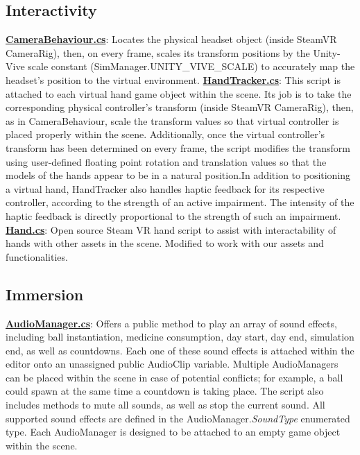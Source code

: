 \documentclass{article}
\begin{document}
\subsection*{Interactivity} 
\href{https://bit.ly/2JH9ws0}{\textbf{CameraBehaviour.cs}}: Locates the physical headset object (inside SteamVR CameraRig), then, on every frame, scales its transform positions by the Unity-Vive scale constant (SimManager.UNITY\_VIVE\_SCALE) to accurately map the headset's position to the virtual environment. \newline \newline
\href{https://bit.ly/2U3xT7n}{\textbf{HandTracker.cs}}: This script is attached to each virtual hand game object within the scene. Its job is to take the corresponding physical controller's transform (inside SteamVR CameraRig), then, as in CameraBehaviour, scale the transform values so that virtual controller is placed properly within the scene. Additionally, once the virtual controller's transform has been determined on every frame, the script modifies the transform using user-defined floating point rotation and translation values so that the models of the hands appear to be in a natural position.\newline In addition to positioning a virtual hand, HandTracker also handles haptic feedback for its respective controller, according to the strength of an active impairment. The intensity of the haptic feedback is directly proportional to the strength of such an impairment. \newline \newline
\href{https://bit.ly/2XLGcmi}{\textbf{Hand.cs}}: Open source Steam VR hand script to assist with interactability of hands with other assets in the scene. Modified to work with our assets and functionalities.


\subsection*{Immersion} 
\href{https://bit.ly/2HHzDwj}{\textbf{AudioManager.cs}}: Offers a public method to play an array of sound effects, including ball instantiation, medicine consumption, day start, day end, simulation end, as well as countdowns. Each one of these sound effects is attached within the editor onto an unassigned public AudioClip variable. Multiple AudioManagers can be placed within the scene in case of potential conflicts; for example, a ball could spawn at the same time a countdown is taking place. The script also includes methods to mute all sounds, as well as stop the current sound. All supported sound effects are defined in the AudioManager.\textit{SoundType} enumerated type. Each AudioManager is designed to be attached to an empty game object within the scene.
\end{document}
